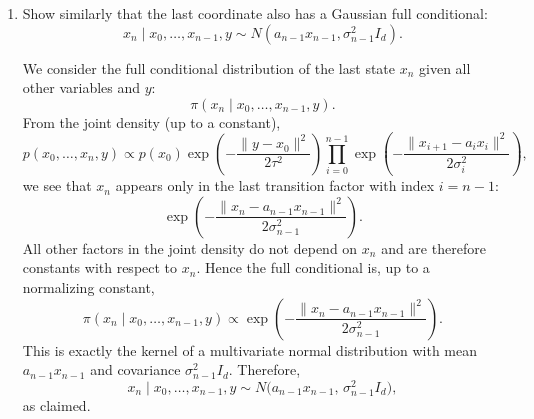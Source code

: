\documentclass[answers,12pt,addpoints]{exam}
\begin{document}
\begin{enumerate}
\begin{enumerate}
\begin{solution}
We now show this is a multivariate normal density in $x_i$ by completing the
square. Expanding the two quadratic terms and discarding all terms independent
of $x_i$, we obtain that the exponent equals
\[
-\frac{1}{2}
\left[
x_i^\top\left(\frac{1}{\sigma_{i-1}^2} I_d + \frac{a_i^2}{\sigma_i^2} I_d\right)x_i
- 2 x_i^\top\left(
\frac{a_{i-1}}{\sigma_{i-1}^2} x_{i-1}
+ \frac{a_i}{\sigma_i^2} x_{i+1}
\right)
\right]
+ \text{const}.
\]
Define
\[
\Lambda_i
= \left(
\frac{1}{\sigma_{i-1}^2}
+ \frac{a_i^2}{\sigma_i^2}
\right) I_d,
\qquad
b_i
= \frac{a_{i-1}}{\sigma_{i-1}^2} x_{i-1}
+ \frac{a_i}{\sigma_i^2} x_{i+1}.
\]
Completing the square,
\[
-\frac{1}{2}\left(x_i^\top \Lambda_i x_i - 2 x_i^\top b_i\right) + \text{const}
= -\frac{1}{2}(x_i - m_i)^\top \Lambda_i (x_i - m_i) + \text{const}',
\]
where
\[
m_i = \Lambda_i^{-1} b_i
= \frac{
\dfrac{a_{i-1}}{\sigma_{i-1}^2} x_{i-1}
+ \dfrac{a_i}{\sigma_i^2} x_{i+1}
}{
\dfrac{1}{\sigma_{i-1}^2} + \dfrac{a_i^2}{\sigma_i^2}
},
\qquad
\Sigma_i = \Lambda_i^{-1}
= \left(
\frac{1}{\sigma_{i-1}^2}
+ \frac{a_i^2}{\sigma_i^2}
\right)^{-1} I_d.
\]
Thus, the full conditional distribution of $x_i$ given all other variables and
$y$ is multivariate Gaussian:
\[
x_i \mid x_{i-1},x_{i+1},\text{rest}
\sim \mathcal{N}\bigl(m_i,\Sigma_i\bigr),
\]
with mean $m_i$ and covariance $\Sigma_i$ as above. In particular, the
conditional depends on the other variables only through $x_{i-1}$ and $x_{i+1}$,
as claimed.
\end{solution}
\item Show similarly that the last coordinate also has a Gaussian full conditional:
\[
x_n \mid x_0, \ldots, x_{n-1}, y \sim N(a_{n-1} x_{n-1}, \sigma_{n-1}^2 I_d).
\]
\begin{solution}
We consider the full conditional distribution of the last state $x_n$ given all
other variables and $y$:
\[
\pi(x_n \mid x_0,\dots,x_{n-1},y).
\]
From the joint density (up to a constant),
\[
p(x_0,\dots,x_n,y)
\propto
p(x_0)
\exp\!\left(
-\frac{\|y - x_0\|^2}{2\tau^2}
\right)
\prod_{i=0}^{n-1}
\exp\!\left(
-\frac{\|x_{i+1} - a_i x_i\|^2}{2\sigma_i^2}
\right),
\]
we see that $x_n$ appears only in the last transition factor with index $i=n-1$:
\[
\exp\!\left(
-\frac{\|x_n - a_{n-1} x_{n-1}\|^2}{2\sigma_{n-1}^2}
\right).
\]
All other factors in the joint density do not depend on $x_n$ and are therefore
constants with respect to $x_n$. Hence the full conditional is, up to a
normalizing constant,
\[
\pi(x_n \mid x_0,\dots,x_{n-1},y)
\propto
\exp\!\left(
-\frac{\|x_n - a_{n-1} x_{n-1}\|^2}{2\sigma_{n-1}^2}
\right).
\]
This is exactly the kernel of a multivariate normal distribution with mean
$a_{n-1} x_{n-1}$ and covariance $\sigma_{n-1}^2 I_d$. Therefore,
\[
x_n \mid x_0,\dots,x_{n-1},y
\sim N\bigl(a_{n-1} x_{n-1},\,\sigma_{n-1}^2 I_d\bigr),
\]
as claimed.
\end{solution}
\end{enumerate}
\end{enumerate}
\end{document}

